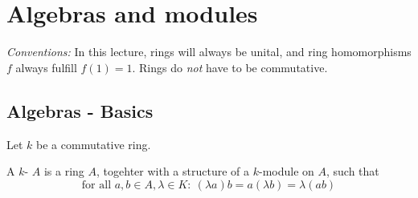 \chapter{Algebras and modules}
\textit{Conventions:} In this lecture, rings will always be unital, and ring homomorphisms $f$ always fulfill $f(1)=1$. Rings do \textit{not} have to be commutative.
\section{Algebras - Basics}
Let $k$ be a commutative ring.
\begin{defn}
	A $k$- $A$ is a ring $A$, togehter with a structure of a $k$-module on $A$, such that
	\begin{equation}\label{1:comp}\tag{$\ast$}
		\text{for all }a,b\in A,\lambda \in K:~(\lambda a)b=a(\lambda b)= \lambda(ab)
	\end{equation}
\end{defn}

